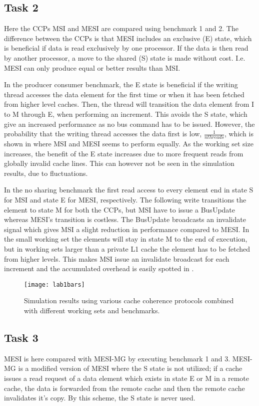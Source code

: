 \subsection{Task 2}
\label{sec:lab12}
Here the CCPs MSI and MESI are compared using benchmark 1 and 2. The difference between the CCPs is that MESI includes an exclusive (E) state, which is beneficial if data is read exclusively by one processor. If the data is then read by another processor, a move to the shared (S) state is made without cost. I.e. MESI can only produce equal or better results than MSI.

In the producer consumer benchmark, the E state is beneficial if the writing thread accesses the data element for the first time or when it has been fetched from higher level caches. Then, the thread will transition the data element from I to M through E, when performing an increment. This avoids the S state, which give an increased performance as no bus command has to be issued. However, the probability that the writing thread accesses the data first is low, $\frac{1}{nthreads}$, which is shown in  where MSI and MESI seems to perform equally. As the working set size increases, the benefit of the E state increases due to more frequent reads from globally invalid cache lines. This can however not be seen in the simulation results, due to fluctuations.

In the no sharing benchmark the first read access to every element end in state S for MSI and state E for MESI, respectively. The following write transitions the element to state M for both the CCPs, but MSI have to issue a BusUpdate whereas MESI's transition is costless. The BusUpdate broadcasts an invalidate signal which gives MSI a slight reduction in performance compared to MESI. In the small working set the elements will stay in state M to the end of execution, but in working sets larger than a private L1 cache the element has to be fetched from higher levels. This makes MSI issue an invalidate broadcast for each increment and the accumulated overhead is easily spotted in . 

\begin{figure}[t]
	\center
	\texttt{[image: lab1bars]}
	\caption{Simulation results using various cache coherence protocols combined with different working sets and benchmarks.}
	\label{fig:lab1bars}
\end{figure}

\subsection{Task 3}
\label{sec:lab13}
MESI is here compared with MESI-MG by executing benchmark 1 and 3. MESI-MG is a modified version of MESI where the S state is not utilized; if a cache issues a read request of a data element which exists in state E or M in a remote cache, the data is forwarded from the remote cache and then the remote cache invalidates it's copy. By this scheme, the S state is never used.

